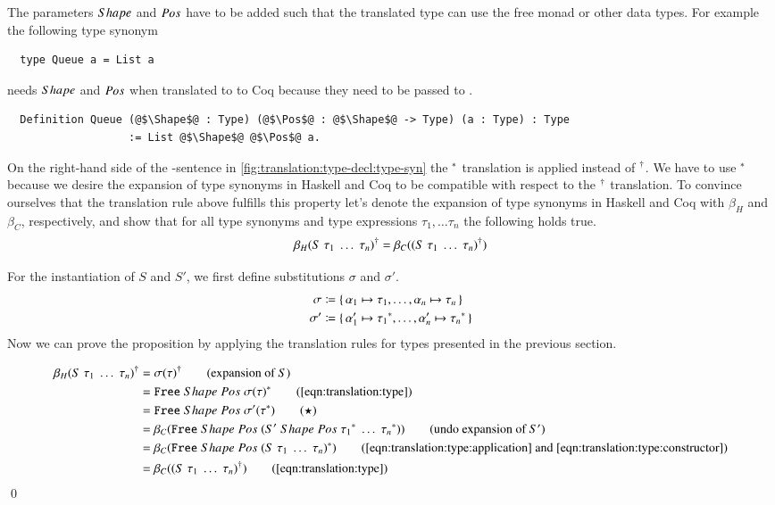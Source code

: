 The parameters $Shape$ and $Pos$ have to be added such that the translated type can use the free monad or other data types.
For example the following type synonym
\begin{verbatim}
  type Queue a = List a
\end{verbatim}
needs $Shape$ and $Pos$ when translated to to Coq because they need to be passed to .
\begin{verbatim}
  Definition Queue (@$\Shape$@ : Type) (@$\Pos$@ : @$\Shape$@ -> Type) (a : Type) : Type
                   := List @$\Shape$@ @$\Pos$@ a.
\end{verbatim}

On the right-hand side of the -sentence in \autoref{fig:translation:type-decl:type-syn} the ${}^{*}$ translation is applied instead of ${}^{\dagger}$.
We have to use ${}^{*}$ because we desire the expansion of type synonyms in Haskell and Coq to be compatible with respect to the ${}^{\dagger}$ translation.
To convince ourselves that the translation rule above fulfills this property let's denote the expansion of type synonyms in Haskell and Coq with $\beta_H$ and $\beta_C$, respectively, and show that for all type synonyms  and type expressions $\tau_1, \ldots \tau_n$ the following holds true.
\[
  {\beta_H(S\;\tau_1\;\ldots\;\tau_n)}^{\dagger}
  = \beta_C({(S\;\tau_1\;\ldots\;\tau_n)}^{\dagger})
\]

For the instantiation of $S$ and $S'$, we first define substitutions $\sigma$ and $\sigma'$.
\begin{align*}
  \sigma &\coloneqq \{\, \alpha_1 \mapsto \tau_1, \ldots, \alpha_n \mapsto \tau_n \,\} \\
  \sigma' &\coloneqq \{\, \alpha_1' \mapsto {\tau_1}^{*}, \ldots, \alpha_n' \mapsto {\tau_n}^{*} \,\}
\end{align*}
Now we can prove the proposition by applying the translation rules for types presented in the previous section.

\begin{align*}
  \toCoq{\beta_H(S\;\tau_1\;\ldots\;\tau_n)}
    &= \toCoq{\sigma(\tau)}
       \tag{expansion of $S$} \\
    &= \Free{\toCoqT{\sigma(\tau)}}
       \tag{\autoref{eqn:translation:type}} \\
    &= \Free{\sigma'(\toCoqT{\tau})}
       \tag{$\star$} \\
    &= \beta_C{(\Free{(\genApply{S'}\;\toCoqT{\tau_1}\;\ldots\;\toCoqT{\tau_n})})}
       \tag{undo expansion of $S'$} \\
    &= \beta_C{(\Free{\toCoqT{(S\;\tau_1\;\ldots\;\tau_n)}})}
       \tag{\autoref{eqn:translation:type:application} and \ref{eqn:translation:type:constructor}} \\
    &= \beta_C(\toCoq{(S\;\tau_1\;\ldots\;\tau_n)})
       \tag{\autoref{eqn:translation:type}}
\end{align*}
\qed

